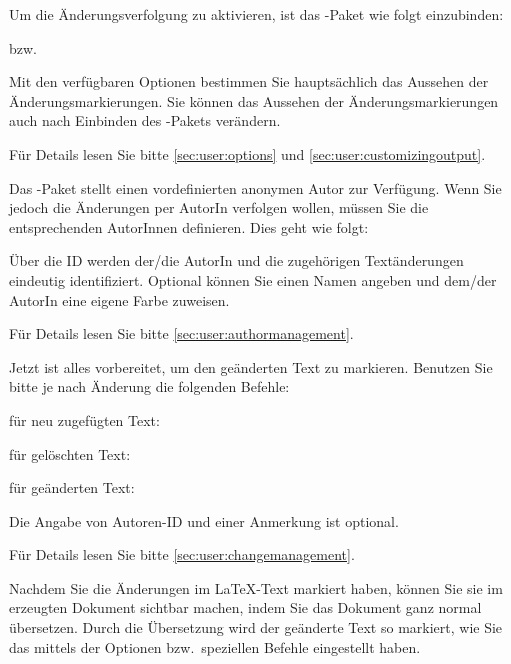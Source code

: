 
Um die Änderungsverfolgung zu aktivieren, ist das -Paket wie folgt einzubinden:


bzw.


Mit den verfügbaren Optionen bestimmen Sie hauptsächlich das Aussehen der Änderungsmarkierungen.
Sie können das Aussehen der Änderungsmarkierungen auch nach Einbinden des -Pakets verändern.

Für Details lesen Sie bitte \autoref{sec:user:options} und \autoref{sec:user:customizingoutput}.


Das -Paket stellt einen vordefinierten anonymen Autor zur Verfügung.
Wenn Sie jedoch die Änderungen per AutorIn verfolgen wollen, müssen Sie die entsprechenden AutorInnen definieren.
Dies geht wie folgt:


Über die ID werden der/die AutorIn und die zugehörigen Textänderungen eindeutig identifiziert.
Optional können Sie einen Namen angeben und dem/der AutorIn eine eigene Farbe zuweisen.

Für Details lesen Sie bitte \autoref{sec:user:authormanagement}.


Jetzt ist alles vorbereitet, um den geänderten Text zu markieren.
Benutzen Sie bitte je nach Änderung die folgenden Befehle:

für neu zugefügten Text:\\

für gelöschten Text:\\

für geänderten Text:\\

Die Angabe von Autoren-ID und einer Anmerkung ist optional.

Für Details lesen Sie bitte \autoref{sec:user:changemanagement}.


Nachdem Sie die Änderungen im \LaTeX-Text markiert haben, können Sie sie im erzeugten Dokument sichtbar machen, indem Sie das Dokument ganz normal übersetzen.
Durch die Übersetzung wird der geänderte Text so markiert, wie Sie das mittels der Optionen bzw.\ speziellen Befehle eingestellt haben.

